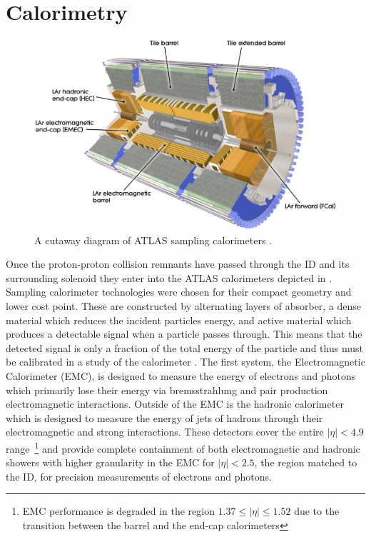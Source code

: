 \section{Calorimetry} \label{sec:atlas:calorimetry}

\begin{figure}[!htbp]
  \begin{center}
    \includegraphics[width=0.8\linewidth]{figures/atlas/calorimeter_cutaway}
    \caption{A cutaway diagram of ATLAS sampling calorimeters \cite{PERF-2007-01}.}
    \label{fig:calorimeter_cutaway}
  \end{center}
\end{figure}

Once the proton-proton collision remnants have passed through the ID and its
surrounding solenoid they enter into the ATLAS calorimeters depicted in
.  Sampling calorimeter technologies were chosen
for their compact geometry and lower cost point.  These are constructed by
alternating layers of absorber, a dense material which reduces the incident
particles energy, and active material which produces a detectable signal when a
particle passes through.  This means that the detected signal is only a
fraction of the total energy of the particle and thus must be calibrated in a
study of the calorimeter \cite{Fabjan:692252}. The first system, the
Electromagnetic Calorimeter (EMC), is designed to measure the energy of
electrons and photons which primarily lose their energy via bremsstrahlung and
pair production electromagnetic interactions.  Outside of the EMC is the
hadronic calorimeter which is designed to measure the energy of jets of hadrons
through their electromagnetic and strong interactions. These detectors cover
the entire $|\eta| < 4.9$ range~\footnote{EMC performance is degraded in the
region $1.37 \leq |\eta| \leq 1.52$ due to the transition between the barrel
and the end-cap calorimeters} and provide complete containment of both
electromagnetic and hadronic showers with higher granularity in the EMC for
$|\eta| < 2.5$, the region matched to the ID, for precision measurements of
electrons and photons.

